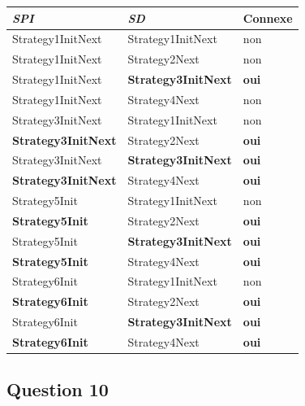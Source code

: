 \documentclass[a4paper]{article}
\begin{document}
\begin{center}
\begin{tabular}{| l | l | l |}
  \hline
  \textsl{SPI} & \textsl{SD} & \textbf{Connexe}\\
  \hline
  Strategy1InitNext & Strategy1InitNext & non\\
  \hline
  Strategy1InitNext & Strategy2Next &  non\\
  \hline
  Strategy1InitNext & \textbf{Strategy3InitNext} & \textbf{oui}\\
  \hline
  Strategy1InitNext & Strategy4Next & non \\
  \hline
  Strategy3InitNext & Strategy1InitNext & non \\
  \hline
  \textbf{Strategy3InitNext} & Strategy2Next & \textbf{oui} \\
  \hline
  Strategy3InitNext & \textbf{Strategy3InitNext} & \textbf{oui}\\
  \hline
  \textbf{Strategy3InitNext} & Strategy4Next & \textbf{oui}\\
  \hline
  Strategy5Init & Strategy1InitNext & non \\
  \hline
  \textbf{Strategy5Init} & Strategy2Next & \textbf{oui}\\
  \hline
  Strategy5Init & \textbf{Strategy3InitNext} & \textbf{oui} \\
  \hline
  \textbf{Strategy5Init} & Strategy4Next & \textbf{oui} \\
  \hline
  Strategy6Init & Strategy1InitNext & non\\
  \hline
  \textbf{Strategy6Init} & Strategy2Next & \textbf{oui} \\
  \hline
  Strategy6Init & \textbf{Strategy3InitNext} & \textbf{oui}\\
  \hline
  \textbf{Strategy6Init} & Strategy4Next & \textbf{oui}\\
  \hline
\end{tabular}
\end{center}


\pagebreak
\subsection{Question 10}
\end{document}
